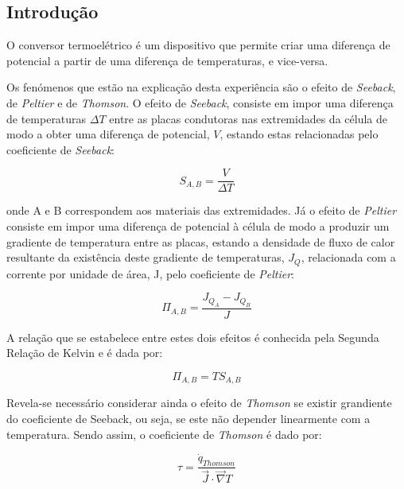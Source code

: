 \documentclass[9pt]{extarticle}
\begin{document}
\begin{multicols}{2}

\section{Introdução}

\par O conversor termoelétrico é um dispositivo que permite criar uma diferença de potencial a partir de uma diferença de temperaturas, e vice-versa. 

\par Os fenómenos que estão na explicação desta experiência são o efeito de \textit{Seeback}, de \textit{Peltier} e de \textit{Thomson}. O efeito de \textit{Seeback}, consiste em impor uma diferença de temperaturas  $\Delta T$ entre as placas condutoras nas extremidades da célula de modo a obter uma diferença de potencial, $V$, estando estas relacionadas pelo coeficiente de \textit{Seeback}:

\begin{equation}
S_{A,B} = \frac{V}{\Delta T}
\end{equation}

\par onde A e B correspondem aos materiais das extremidades. Já o efeito de \textit{Peltier} consiste em impor uma diferença de potencial à célula de modo a produzir um gradiente de temperatura entre as placas, estando a densidade de fluxo de calor resultante da existência deste gradiente de temperaturas, $J_Q$, relacionada com a corrente por unidade de área, J, pelo coeficiente de \textit{Peltier}:

\begin{equation}
\Pi_{A,B} = \frac{J_{Q_{A}}-J_{Q_{B}}}{J}
\end{equation}

\par A relação que se estabelece entre estes dois efeitos é conhecida pela Segunda Relação de Kelvin e é dada por:

\begin{equation}
\Pi_{A,B} = T S_{A,B}
\end{equation}

\par Revela-se necessário considerar ainda o efeito de \textit{Thomson} se existir grandiente do coeficiente de Seeback, ou seja, se este não depender linearmente com a temperatura. Sendo assim, o coeficiente de \textit{Thomson} é dado por:

\begin{equation}
\tau = \frac{\dot{q}_{Thomson}}{\vec{J} \cdot \vec{\nabla} T}
\end{equation}


\end{multicols}
\end{document}

